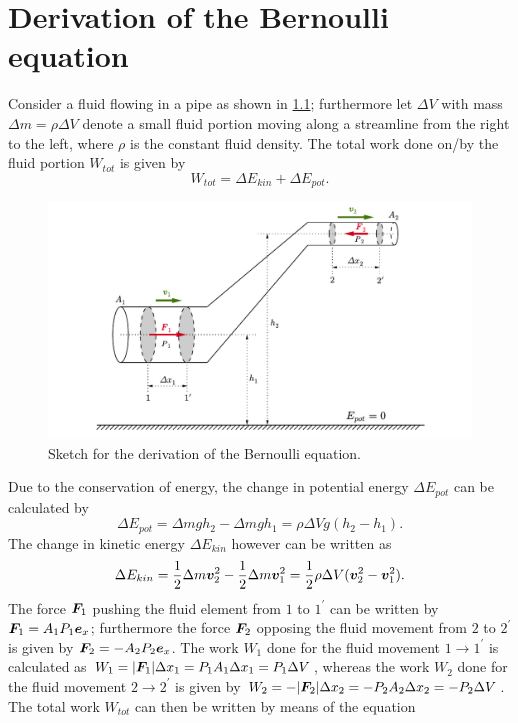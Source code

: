 \documentclass[a4paper,11pt]{report}
\begin{document}
\appendix
\chapter{Derivation of the Bernoulli equation}
Consider a fluid flowing in a pipe as shown in \cref{fig:bernoulliderivation}; furthermore let $\Delta V$ with mass $\Delta m = \rho\Delta V$ denote a small fluid portion moving along a streamline from the right to the left, where $\rho$ is the constant fluid density. The total work done on/by the fluid portion  $W_{tot}$ is given by \begin{equation}
W_{tot} = \Delta E_{kin} + \Delta E_{pot}.
\end{equation}
\begin{figure}[h]
\centering
\includegraphics[width=12cm]{figures/bernoulliderivation.pdf}
\caption{Sketch for the derivation of the Bernoulli equation.}
\label{fig:bernoulliderivation}
\end{figure} Due to the conservation of energy, the change in potential energy $\Delta E_{pot}$ can be calculated by \begin{equation}
\Delta E_{pot} = \Delta m g h_2 - \Delta m g h_1 = \rho \Delta V g (h_2-h_1).
\end{equation} The change in kinetic energy $\Delta E_{kin}$ however can be written as \begin{equation}
\Delta E_{kin} = \frac{1}{2}\Delta m \bm{v}_2^2 - \frac{1}{2}\Delta m \bm{v}_1^2 = \frac{1}{2}\rho \Delta V (\bm{v}_2^2-\bm{v}_1^2).
\end{equation} The force $\bm{F}_1$ pushing the fluid element from $1$ to $1^\prime$ can be written by  $\bm{F}_1 = A_1P_1\bm{e}_x$; furthermore the force $\bm{F}_2$ opposing the fluid movement from $2$ to $2^\prime$ is given by $\bm{F}_2 = -A_2 P_2\bm{e}_x$. The work $W_1$ done for the fluid movement $1\rightarrow 1^\prime$ is calculated as $W_1 = |\bm{F}_1|\Delta x_1 = P_1A_1\Delta x_1 = P_1\Delta V$, whereas the work $W_2$ done for the fluid movement $2\rightarrow 2^\prime$ is given by $W_2 = -|\bm{F}_2|\Delta x_2 = -P_2A_2\Delta x_2 = -P_2\Delta V$. The total work $W_{tot}$ can then be written by means of the equation \begin{gather}

\end{gather}
\end{document}
